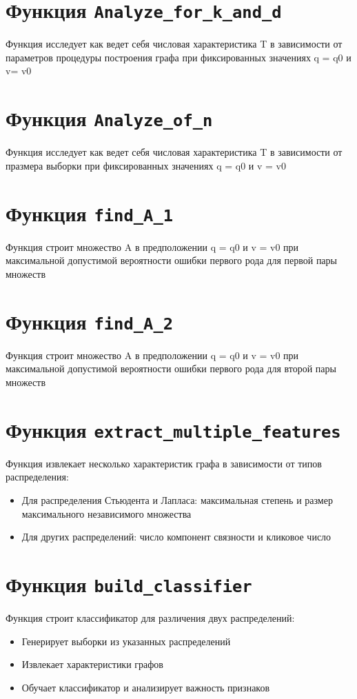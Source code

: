 \documentclass{article}
\begin{document}
\section{Функция \texttt{Analyze\_for\_k\_and\_d}}

Функция исследует  как ведет себя числовая характеристика T в зависимости от параметров процедуры построения графа при фиксированных значениях q = q0 и v= v0

\section{Функция \texttt{Analyze\_of\_n}}

Функция исследует  как ведет себя числовая характеристика T в зависимости от празмера выборки при фиксированных значениях q = q0 и v = v0

\section{Функция \texttt{find\_A\_1}}

Функция строит множество A в предположении q = q0 и v = v0 при максимальной допустимой вероятности ошибки первого рода для первой пары множеств

\section{Функция \texttt{find\_A\_2}}

Функция строит множество A в предположении q = q0 и v = v0 при максимальной допустимой вероятности ошибки первого рода для второй пары множеств

\section{Функция \texttt{extract\_multiple\_features}}
Функция извлекает несколько характеристик графа в зависимости от типов распределения:
\begin{itemize}
\item Для распределения Стьюдента и Лапласа: максимальная степень и размер максимального независимого множества
\item Для других распределений: число компонент связности и кликовое число
\end{itemize}

\section{Функция \texttt{build\_classifier}}
Функция строит классификатор для различения двух распределений:
\begin{itemize}
\item Генерирует выборки из указанных распределений
\item Извлекает характеристики графов
\item Обучает классификатор и анализирует важность признаков
\end{itemize}
\end{document}
